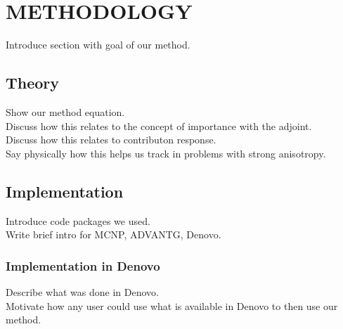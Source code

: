\documentclass[12pt]{article}
\begin{document}
%
\section{METHODOLOGY}
\label{sect::second}

Introduce section with goal of our method. \\

%
\subsection{Theory}
\label{subsect::major}

Show our method equation. \\
Discuss how this relates to the concept of importance with the adjoint. \\
Discuss how this relates to contributon response. \\
Say physically how this helps us track in problems with strong anisotropy. \\

%

\subsection{Implementation}
\label{subsect::major}

Introduce code packages we used. \\
Write brief intro for MCNP, ADVANTG, Denovo. \\


%
\subsubsection{Implementation in Denovo} 
\label{subsubsect::minor}

Describe what was done in Denovo. \\
Motivate how any user could use what is available in Denovo to then use our method. \\
\end{document}
